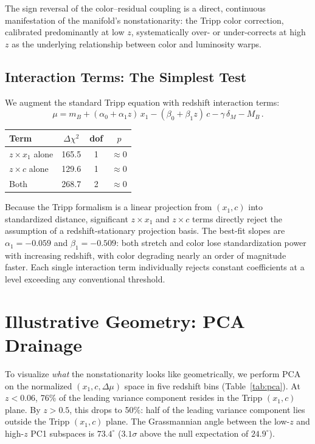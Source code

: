 \documentclass[twocolumn,showpacs,preprintnumbers,amsmath,amssymb,prl]{revtex4-2}
\begin{document}
The sign reversal of the color--residual coupling is a direct, continuous manifestation of the manifold's nonstationarity: the Tripp color correction, calibrated predominantly at low $z$, systematically over- or under-corrects at high $z$ as the underlying relationship between color and luminosity warps.

\subsection{Interaction Terms: The Simplest Test}
\label{sec:interaction}

We augment the standard Tripp equation with redshift interaction terms:
\begin{equation}
\mu = m_B + (\alpha_0 + \alpha_1 z)\, x_1 - (\beta_0 + \beta_1 z)\, c - \gamma\,\delta_M - M_B\,.
\end{equation}

\begin{center}
\begin{tabular}{lccc}
\hline\hline
Term & $\Delta\chi^2$ & dof & $p$ \\
\hline
$z \times x_1$ alone & 165.5 & 1 & $\approx 0$ \\
$z \times c$ alone & 129.6 & 1 & $\approx 0$ \\
Both & 268.7 & 2 & $\approx 0$ \\
\hline\hline
\end{tabular}
\end{center}

Because the Tripp formalism is a linear projection from $(x_1, c)$ into standardized distance, significant $z \times x_1$ and $z \times c$ terms directly reject the assumption of a redshift-stationary projection basis. The best-fit slopes are $\alpha_1 = -0.059$ and $\beta_1 = -0.509$: both stretch and color lose standardization power with increasing redshift, with color degrading nearly an order of magnitude faster. Each single interaction term individually rejects constant coefficients at a level exceeding any conventional threshold.

\section{Illustrative Geometry: PCA Drainage}
\label{sec:pca}

To visualize \emph{what} the nonstationarity looks like geometrically, we perform PCA on the normalized $(x_1, c, \Delta\mu)$ space in five redshift bins (Table~\ref{tab:pca}). At $z < 0.06$, 76\% of the leading variance component resides in the Tripp $(x_1, c)$ plane. By $z > 0.5$, this drops to 50\%: half of the leading variance component lies outside the Tripp $(x_1, c)$ plane. The Grassmannian angle between the low-$z$ and high-$z$ PC1 subspaces is $73.4^\circ$ ($3.1\sigma$ above the null expectation of $24.9^\circ$).
\end{document}
